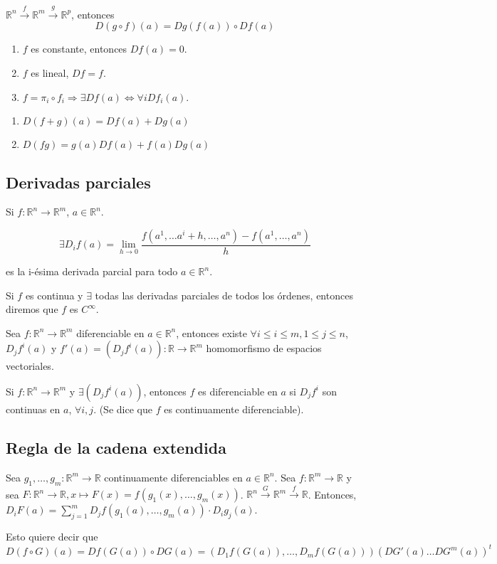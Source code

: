 $\mathbb{R}^n\xrightarrow{f} \mathbb{R}^m \xrightarrow{g} \mathbb{R}^p$, entonces
$$D(g\circ f)(a)=Dg(f(a))\circ Df(a) $$

\begin{enumerate}
\item $f$ es constante, entonces $Df(a)=0$.
\item $f$ es lineal, $Df=f$.
\item $f= \pi_i \circ f_i \Rightarrow \exists Df(a) \Leftrightarrow \forall i Df_i(a)$. 
\end{enumerate}

\begin{Cor}
\begin{enumerate}
\item $D(f+g)(a)=Df(a)+Dg(a)$
\item $D(fg)=g(a)Df(a)+f(a)Dg(a)$
\end{enumerate}
\end{Cor}

\subsection{Derivadas parciales}


Si $f:\mathbb{R}^n \rightarrow \mathbb{R}^m$, $a\in \mathbb{R}^n$.

$$\exists D_if(a)=\lim_{h\rightarrow 0} \frac{f(a^1,\dots a^i+h,\dots , a^n)-f(a^1,\dots , a^n)}{h}$$

es la i-ésima derivada parcial para todo $a\in \mathbb{R}^n$.


Si $f$ es continua y $\exists $ todas las derivadas parciales de todos los órdenes, entonces diremos que $f$ es $C^\infty $.


\begin{Teo}
Sea $f:\mathbb{R}^n\rightarrow \mathbb{R}^m$ diferenciable en $a\in \mathbb{R}^n$, entonces existe $\forall i\le i \le m, 1\le j \le n$, $D_jf^i(a)$ y $f'(a)=(D_jf^i(a)):\mathbb{R}\rightarrow \mathbb{R}^m$ homomorfismo de espacios vectoriales. 
\end{Teo}

\begin{Teo}
Si $f:\mathbb{R}^n\rightarrow \mathbb{R}^m$ y $\exists (D_jf^i(a))$, entonces $f$ es diferenciable en $a$ si $D_jf^i$ son continuas en $a$, $\forall i,j$.  (Se dice que $f$ es continuamente diferenciable). 
\end{Teo}

\subsection{Regla de la cadena extendida}

Sea $g_1,\dots, g_m:\mathbb{R}^m \rightarrow \mathbb{R}$ continuamente diferenciables en $a\in \mathbb{R}^n$.  Sea $f:\mathbb{R}^m\rightarrow \mathbb{R}$ y sea $F:\mathbb{R}^n\rightarrow \mathbb{R}, x\mapsto F(x)=f(g_1(x),\dots , g_m(x))$. $\mathbb{R}^n\xrightarrow{G} \mathbb{R}^m \xrightarrow{f} \mathbb{R}$. Entonces, $D_iF(a)=\sum_{j=1}^m D_jf(g_1(a),\dots , g_m(a))\cdot D_ig_j(a)$.

Esto quiere decir que 
$$D(f\circ G)(a)=Df(G(a))\circ DG(a)=(D_1f(G(a)),\dots, D_mf(G(a))) (DG'(a)\dots DG^m(a))^t$$